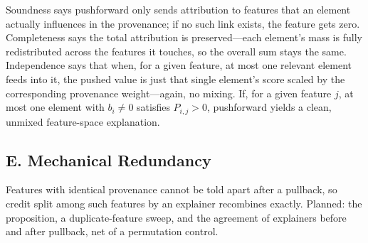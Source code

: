 

Soundness says pushforward only sends attribution to features that an element actually influences in the provenance; if no such link exists, the feature gets zero. Completeness says the total attribution is preserved—each element’s mass is fully redistributed across the features it touches, so the overall sum stays the same. Independence says that when, for a given feature, at most one relevant element feeds into it, the pushed value is just that single element’s score scaled by the corresponding provenance weight—again, no mixing. If, for a given feature $j$, at most one element with $b_i\neq 0$ satisfies $P_{i,j}>0$, pushforward yields a clean, unmixed feature-space explanation.


\subsection*{E. Mechanical Redundancy}
\label{sec:XML:AppRedundancy}

\begin{proposalbox}
Features with identical provenance cannot be told apart after a pullback, so credit split among such features by an explainer recombines exactly. Planned: the proposition, a duplicate-feature sweep, and the agreement of explainers before and after pullback, net of a permutation control.
\end{proposalbox}


